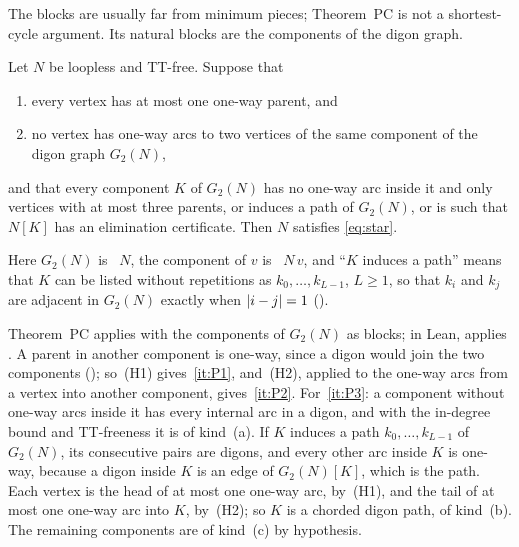 The blocks are usually far from minimum pieces; Theorem~PC is not a shortest-cycle argument. Its natural blocks are the
components of the digon graph.

\begin{corollary}\label{cor:PC-digon}
Let $N$ be loopless and TT-free. Suppose that
\begin{enumerate}[label=(H\arabic*),leftmargin=3em]
\item every vertex has at most one one-way parent, and
\item no vertex has one-way arcs to two vertices of the same component of the digon graph $G_2(N)$,
\end{enumerate}
and that every component $K$ of $G_2(N)$ has no one-way arc inside it and only vertices with at most three parents, or
induces a path of $G_2(N)$, or is such that $N[K]$ has an elimination certificate. Then $N$ satisfies \eqref{eq:star}.
\end{corollary}

Here $G_2(N)$ is ~$N$, the component of $v$ is ~$N\,v$, and ``$K$ induces a path'' means
that $K$ can be listed without repetitions as $k_0,\dots,k_{L-1}$, $L\ge1$, so that $k_i$ and $k_j$ are adjacent in
$G_2(N)$ exactly when $\lvert i-j \rvert=1$ ().

\begin{outline}
Theorem~PC applies with the components of $G_2(N)$ as blocks; in Lean,  applies
. A parent in another component is one-way, since a digon would join the two components
(); so~(H1) gives~\ref{it:P1}, and~(H2), applied to the one-way arcs from a vertex into another
component, gives~\ref{it:P2}.
For~\ref{it:P3}: a component without one-way arcs inside it has every internal arc in a digon, and with the in-degree
bound and TT-freeness it is of kind~(a). If $K$ induces a path $k_0,\dots,k_{L-1}$ of $G_2(N)$, its consecutive pairs are
digons, and every other arc inside $K$ is one-way, because a digon inside $K$ is an edge of $G_2(N)[K]$, which is the path.
Each vertex is the head of at most one one-way arc, by~(H1), and the tail of at most one one-way arc into $K$, by~(H2);
so $K$ is a chorded digon path, of kind~(b). The remaining components are of kind~(c) by hypothesis.
\end{outline}

